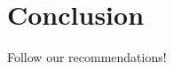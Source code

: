 \documentclass[conference]{IEEEtran}
\begin{document}
\section{Conclusion}
Follow our recommendations!




\end{document}
